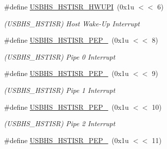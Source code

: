 \begin{DoxyCompactItemize}
\mbox{\label{group__SAMV71__USBHS_gafbd5ce141cbeda44deeeb8803154192b}} 
\#define \mbox{\hyperlink{group__SAMV71__USBHS_gafbd5ce141cbeda44deeeb8803154192b}{U\+S\+B\+H\+S\+\_\+\+H\+S\+T\+I\+S\+R\+\_\+\+H\+W\+U\+PI}}~(0x1u $<$$<$ 6)
\begin{DoxyCompactList}\small\item\em (U\+S\+B\+H\+S\+\_\+\+H\+S\+T\+I\+SR) Host Wake-\/\+Up Interrupt \end{DoxyCompactList}\item 
\mbox{\label{group__SAMV71__USBHS_ga1d551b0793867638a6420df8f4a25645}} 
\#define \mbox{\hyperlink{group__SAMV71__USBHS_ga1d551b0793867638a6420df8f4a25645}{U\+S\+B\+H\+S\+\_\+\+H\+S\+T\+I\+S\+R\+\_\+\+P\+E\+P\+\_}}~(0x1u $<$$<$ 8)
\begin{DoxyCompactList}\small\item\em (U\+S\+B\+H\+S\+\_\+\+H\+S\+T\+I\+SR) Pipe 0 Interrupt \end{DoxyCompactList}\item 
\mbox{\label{group__SAMV71__USBHS_ga5edb873128c0048654135ac51a4d9b0a}} 
\#define \mbox{\hyperlink{group__SAMV71__USBHS_ga5edb873128c0048654135ac51a4d9b0a}{U\+S\+B\+H\+S\+\_\+\+H\+S\+T\+I\+S\+R\+\_\+\+P\+E\+P\+\_}}~(0x1u $<$$<$ 9)
\begin{DoxyCompactList}\small\item\em (U\+S\+B\+H\+S\+\_\+\+H\+S\+T\+I\+SR) Pipe 1 Interrupt \end{DoxyCompactList}\item 
\mbox{\label{group__SAMV71__USBHS_ga461b2c6b064c0598a325c453934b9b1a}} 
\#define \mbox{\hyperlink{group__SAMV71__USBHS_ga461b2c6b064c0598a325c453934b9b1a}{U\+S\+B\+H\+S\+\_\+\+H\+S\+T\+I\+S\+R\+\_\+\+P\+E\+P\+\_}}~(0x1u $<$$<$ 10)
\begin{DoxyCompactList}\small\item\em (U\+S\+B\+H\+S\+\_\+\+H\+S\+T\+I\+SR) Pipe 2 Interrupt \end{DoxyCompactList}\item 
\mbox{\label{group__SAMV71__USBHS_gac98e3e9598d0c0a054482c1ab99b67c3}} 
\#define \mbox{\hyperlink{group__SAMV71__USBHS_gac98e3e9598d0c0a054482c1ab99b67c3}{U\+S\+B\+H\+S\+\_\+\+H\+S\+T\+I\+S\+R\+\_\+\+P\+E\+P\+\_}}~(0x1u $<$$<$ 11)
$$
\end{DoxyCompactItemize}
